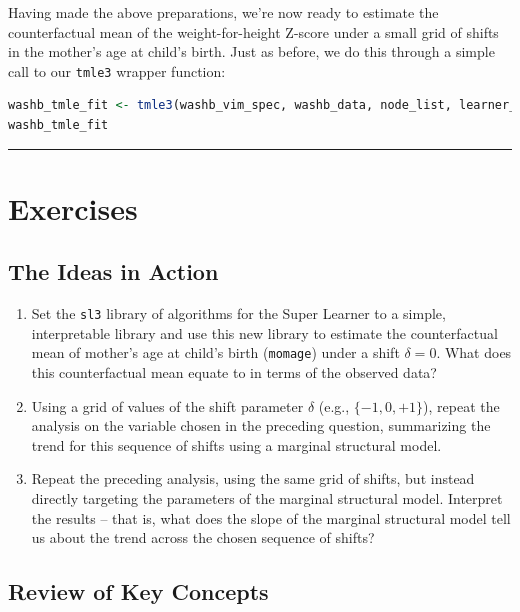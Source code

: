 \documentclass[
  12pt, krantz2,
]{krantz}
\newcommand{\passthrough}[1]{#1}
\theoremstyle{definition}
\theoremstyle{definition}
\theoremstyle{definition}
\newcommand{\1}{\mathbbm{1}}
\begin{document}
Having made the above preparations, we're now ready to estimate the
counterfactual mean of the weight-for-height Z-score under a small grid of
shifts in the mother's age at child's birth. Just as before, we do this through
a simple call to our \passthrough{\lstinline!tmle3!} wrapper function:

\begin{lstlisting}[language=R]
washb_tmle_fit <- tmle3(washb_vim_spec, washb_data, node_list, learner_list)
washb_tmle_fit
\end{lstlisting}

\begin{center}\rule{0.5\linewidth}{0.5pt}\end{center}

\hypertarget{exercises-3}{%
\section{Exercises}\label{exercises-3}}

\hypertarget{the-ideas-in-action-1}{%
\subsection{The Ideas in Action}\label{the-ideas-in-action-1}}

\begin{enumerate}
\def\labelenumi{\arabic{enumi}.}
\item
  Set the \passthrough{\lstinline!sl3!} library of algorithms for the Super Learner to a simple,
  interpretable library and use this new library to estimate the
  counterfactual mean of mother's age at child's birth (\passthrough{\lstinline!momage!}) under a
  shift \(\delta = 0\). What does this counterfactual mean equate to in terms
  of the observed data?
\item
  Using a grid of values of the shift parameter \(\delta\) (e.g., \(\{-1, 0, +1\}\)), repeat the analysis on the variable chosen in the preceding
  question, summarizing the trend for this sequence of shifts using a marginal
  structural model.
\item
  Repeat the preceding analysis, using the same grid of shifts, but instead
  directly targeting the parameters of the marginal structural model.
  Interpret the results -- that is, what does the slope of the marginal
  structural model tell us about the trend across the chosen sequence of
  shifts?
\end{enumerate}

\hypertarget{review-of-key-concepts-2}{%
\subsection{Review of Key Concepts}\label{review-of-key-concepts-2}}
\end{document}

